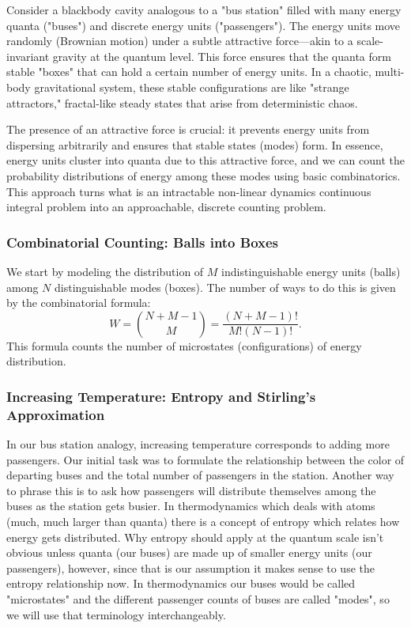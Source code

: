 \documentclass{report}
\begin{document}
Consider a blackbody cavity analogous to a "bus station" filled with many energy quanta ("buses") and discrete energy units ("passengers"). The energy units move randomly (Brownian motion) under a subtle attractive force—akin to a scale-invariant gravity at the quantum level. This force ensures that the quanta form stable "boxes" that can hold a certain number of energy units. In a chaotic, multi-body gravitational system, these stable configurations are like "strange attractors," fractal-like steady states that arise from deterministic chaos.

The presence of an attractive force is crucial: it prevents energy units from dispersing arbitrarily and ensures that stable states (modes) form. In essence, energy units cluster into quanta due to this attractive force, and we can count the probability distributions of energy among these modes using basic combinatorics. This approach turns what is an intractable non-linear dynamics continuous integral problem into an approachable, discrete counting problem.

\subsubsection*{Combinatorial Counting: Balls into Boxes}

We start by modeling the distribution of $M$ indistinguishable energy units (balls) among $N$ distinguishable modes (boxes). The number of ways to do this is given by the combinatorial formula:
\[
W = \binom{N+M-1}{M} = \frac{(N+M-1)!}{M!(N-1)!}.
\]
This formula counts the number of microstates (configurations) of energy distribution.

\subsubsection*{Increasing Temperature: Entropy and Stirling’s Approximation}
In our bus station analogy, increasing temperature corresponds to adding more passengers. Our initial task was to formulate the relationship between the color of departing buses and the total number of passengers in the station. Another way to phrase this is to ask how passengers will distribute themselves among the buses as the station gets busier. In thermodynamics which deals with atoms (much, much larger than quanta) there is a concept of entropy which relates how energy gets distributed. Why entropy should apply at the quantum scale isn't obvious unless quanta (our buses) are made up of smaller energy units (our passengers), however, since that is our assumption it makes sense to use the entropy relationship now. In thermodynamics our buses would be called "microstates" and the different passenger counts of buses are called "modes", so we will use that terminology interchangeably.
\newline
\end{document}
